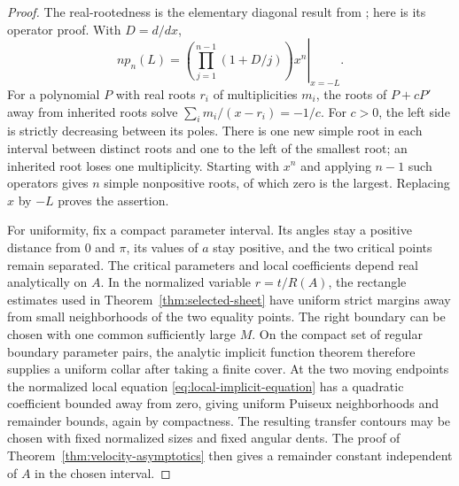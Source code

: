 \begin{proof}
The real-rootedness is the elementary diagonal result from
\cite{HarmonicBaseline}; here is its operator proof.  With $D=d/dx$,
\[
 n p_n(L)=
 \left.\left(\prod_{j=1}^{n-1}(1+D/j)\right)x^n\right|_{x=-L}.
\]
For a polynomial $P$ with real roots $r_i$ of multiplicities $m_i$,
the roots of $P+cP'$ away from inherited roots solve
$\sum_i m_i/(x-r_i)=-1/c$.  For $c>0$, the left side is strictly
decreasing between its poles.  There is one new simple root in each
interval between distinct roots and one to the left of the smallest
root; an inherited root loses one multiplicity.  Starting with $x^n$
and applying $n-1$ such operators gives $n$ simple nonpositive roots,
of which zero is the largest.  Replacing $x$ by $-L$ proves the assertion.

For uniformity, fix a compact parameter interval.  Its angles stay a
positive distance from $0$ and $\pi$, its values of $a$ stay positive,
and the two critical points remain separated.  The critical parameters
and local coefficients depend real analytically on $A$.  In the
normalized variable $r=t/R(A)$, the rectangle estimates used in
Theorem~\ref{thm:selected-sheet} have uniform strict margins away from
small neighborhoods of the two equality points.  The right boundary
can be chosen with one common sufficiently large $M$.  On the compact
set of regular boundary parameter pairs, the analytic implicit function
theorem therefore supplies a uniform collar after taking a finite cover.
At the two moving endpoints the normalized local equation
\eqref{eq:local-implicit-equation} has a quadratic coefficient bounded
away from zero, giving uniform Puiseux neighborhoods and remainder
bounds, again by compactness.  The resulting transfer contours may be
chosen with fixed normalized sizes and fixed angular dents.  The proof
of Theorem~\ref{thm:velocity-asymptotics} then gives a remainder constant
independent of $A$ in the chosen interval.
\end{proof}

